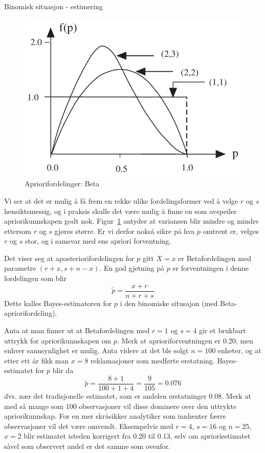{{\begin{eksempel}{Binomisk situasjon - estimering}
\begin{figure}[ht]
\centering
   \includegraphics[scale=0.9]{figurer/fig16_x.pdf} 
 \caption{Apriorifordelinger: Beta}
	\label{fig:apriorifordelinger}
\end{figure}
	                   
Vi ser at det er mulig å få frem en rekke ulike fordelingsformer ved 
å velge $r$ og $s$ hensiktsmessig, og i praksis skulle det være mulig
å finne en som avspeiler apriorikunnskapen godt nok.
Figur~\ref{fig:apriorifordelinger} antyder at variansen blir mindre og mindre ettersom $r$ og $s$ 
gjøres større. Er vi derfor nokså sikre på hva $p$ omtrent er,
velges $r$ og $s$ stor, og i samsvar med ens apriori forventning.

Det viser seg at aposteriorifordelingen for $p$ gitt $X=x$ er Betafordelingen
med parametre $(r+x,s+n-x)$. En god gjetning på $p$ er forvent\-ningen i denne
fordelingen som blir
\[   \tilde{p} = \frac{x+r}{n+r+s}   \] 
Dette kalles Bayes-estimatoren for $p$ i den binomiske situsajon
(med Beta-apriorifordeling).

Anta at man finner ut at Betafordelingen med $r=1$ og $s=4$
gir et brukbart uttrykk for apriorikunnskapen om $p$. 
Merk at aprioriforventningen er 0.20, men enhver sannsynlighet er mulig.
Anta videre at det ble solgt $n=100$ enheter, og at etter ett år fikk man
$x=8$ reklamasjoner som medførte erstatning.
Bayes-estimatet for $p$ blir da
\[   \tilde{p} = \frac{8+1}{100+1+4} = \frac{9}{105}=0.076    \] 
dvs. nær det tradisjonelle estimatet, som er andelen erstatninger 0.08.
Merk at med så mange som 100 observasjoner vil disse dominere over den
uttrykte apriorikunnskap. For en mer skråsikker analytiker som innhenter
færre observasjoner vil det være omvendt. Eksempelvis med $r=4$, 
$s=16$ og $n=25$, $x=2$ blir estimatet isteden korrigert fra 0.20 til 0.13, 
selv om aprioriestimatet såvel som observert andel er det samme som ovenfor.
\end{eksempel}



}}
